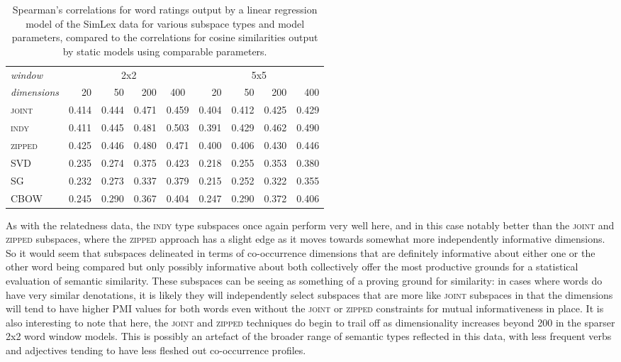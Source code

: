 \begin{table}
\centering
\begin{tabular}{lrrrr|rrrr}
\hline
\emph{window} & \multicolumn{4}{c}{2x2} & \multicolumn{4}{c}{5x5} \\
\emph{dimensions} & 20 & 50 & 200 & \multicolumn{1}{c}{400} & 20 & 50 & 200 & 400 \\
\hline
\textsc{joint} & 0.414 & 0.444 & 0.471 & 0.459 & 0.404 & 0.412 & 0.425 & 0.429 \\
\textsc{indy} & 0.411 & 0.445 & 0.481 & 0.503 & 0.391 & 0.429 & 0.462 & 0.490 \\
\textsc{zipped} & 0.425 & 0.446 & 0.480 & 0.471 & 0.400 & 0.406 & 0.430 & 0.446 \\
\textsc{SVD} & 0.235 & 0.274 & 0.375 & 0.423 & 0.218 & 0.255 & 0.353 & 0.380 \\
\textsc{SG} & 0.232 & 0.273 & 0.337 & 0.379 & 0.215 & 0.252 & 0.322 & 0.355 \\
\textsc{CBOW} & 0.245 & 0.290 & 0.367 & 0.404 & 0.247 & 0.290 & 0.372 & 0.406 \\
\hline
\end{tabular}
\caption{Spearman's correlations for word ratings output by a linear regression model of the SimLex data for various subspace types and model parameters, compared to the correlations for cosine similarities output by static models using comparable parameters.}
\label{tab:similar}
\end{table}

As with the relatedness data, the \textsc{indy} type subspaces once again perform very well here, and in this case notably better than the \textsc{joint} and \textsc{zipped} subspaces, where the \textsc{zipped} approach has a slight edge as it moves towards somewhat more independently informative dimensions.  So it would seem that subspaces delineated in terms of co-occurrence dimensions that are definitely informative about either one or the other word being compared but only possibly informative about both collectively offer the most productive grounds for a statistical evaluation of semantic similarity.  These subspaces can be seeing as something of a proving ground for similarity: in cases where words do have very similar denotations, it is likely they will independently select subspaces that are more like \textsc{joint} subspaces in that the dimensions will tend to have higher PMI values for both words even without the \textsc{joint} or \textsc{zipped} constraints for mutual informativeness in place.  It is also interesting to note that here, the \textsc{joint} and \textsc{zipped} techniques do begin to trail off as dimensionality increases beyond 200 in the sparser 2x2 word window models.  This is possibly an artefact of the broader range of semantic types reflected in this data, with less frequent verbs and adjectives tending to have less fleshed out co-occurrence profiles.

